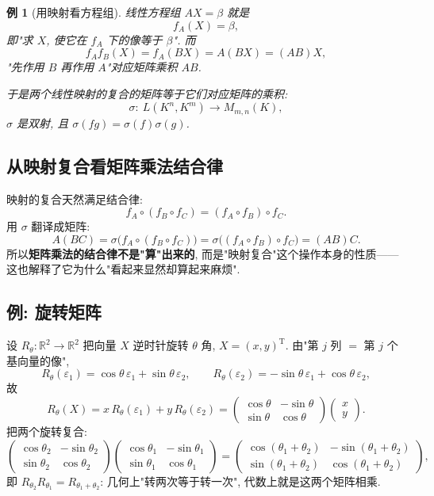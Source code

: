 \documentclass[UTF8,11pt]{ctexart}
\theoremstyle{cnthm}
\newtheorem{exa}[thm]{例}
\begin{document}
\begin{exa}[用映射看方程组]
线性方程组 $AX=\beta$ 就是
\[
f_A(X)=\beta,
\]
即"求 $X$, 使它在 $f_A$ 下的像等于 $\beta$". 而
\[
f_Af_B(X)=f_A(BX)=A(BX)=(AB)X,
\]
"先作用 $B$ 再作用 $A$"对应矩阵乘积 $AB$.

于是两个线性映射的复合的矩阵等于它们对应矩阵的乘积:
\[
\sigma:\ L(K^n,K^m)\longrightarrow M_{m,n}(K),
\]
$\sigma$ 是双射, 且 $\sigma(fg)=\sigma(f)\sigma(g)$.
\end{exa}

\subsection{从映射复合看矩阵乘法结合律}

映射的复合天然满足结合律:
\[
f_A\circ(f_B\circ f_C)=(f_A\circ f_B)\circ f_C .
\]
用 $\sigma$ 翻译成矩阵:
\[
A(BC)=\sigma\bigl(f_A\circ(f_B\circ f_C)\bigr)
=\sigma\bigl((f_A\circ f_B)\circ f_C\bigr)=(AB)C .
\]
所以\textbf{矩阵乘法的结合律不是"算"出来的}, 而是"映射复合"这个操作本身的性质——这也解释了它为什么"看起来显然却算起来麻烦".

\subsection{例: 旋转矩阵}

设 $R_\theta:\mathbb{R}^2\to\mathbb{R}^2$ 把向量 $X$ 逆时针旋转 $\theta$ 角, $X=(x,y)^{\mathrm T}$. 由"第 $j$ 列 $=$ 第 $j$ 个基向量的像",
\[
R_\theta(\varepsilon_1)=\cos\theta\,\varepsilon_1+\sin\theta\,\varepsilon_2,
\qquad
R_\theta(\varepsilon_2)=-\sin\theta\,\varepsilon_1+\cos\theta\,\varepsilon_2,
\]
故
\[
R_\theta(X)=x\,R_\theta(\varepsilon_1)+y\,R_\theta(\varepsilon_2)
=\begin{pmatrix}\cos\theta&-\sin\theta\\ \sin\theta&\cos\theta\end{pmatrix}
\begin{pmatrix}x\\y\end{pmatrix}.
\]
把两个旋转复合:
\[
\begin{pmatrix}\cos\theta_2&-\sin\theta_2\\ \sin\theta_2&\cos\theta_2\end{pmatrix}
\begin{pmatrix}\cos\theta_1&-\sin\theta_1\\ \sin\theta_1&\cos\theta_1\end{pmatrix}
=
\begin{pmatrix}\cos(\theta_1+\theta_2)&-\sin(\theta_1+\theta_2)\\
\sin(\theta_1+\theta_2)&\cos(\theta_1+\theta_2)\end{pmatrix},
\]
即 $R_{\theta_2}R_{\theta_1}=R_{\theta_1+\theta_2}$: 几何上"转两次等于转一次", 代数上就是这两个矩阵相乘.
\end{document}
